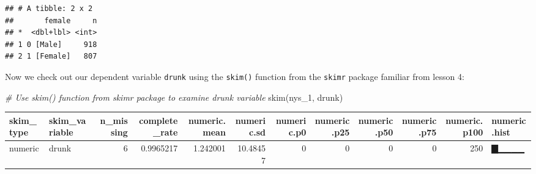 \documentclass[
]{book}
\newenvironment{Shaded}{\begin{snugshade}}{\end{snugshade}}
\newcommand{\AttributeTok}[1]{\textcolor[rgb]{0.77,0.63,0.00}{#1}}
\newcommand{\CommentTok}[1]{\textcolor[rgb]{0.56,0.35,0.01}{\textit{#1}}}
\newcommand{\DecValTok}[1]{\textcolor[rgb]{0.00,0.00,0.81}{#1}}
\newcommand{\FunctionTok}[1]{\textcolor[rgb]{0.00,0.00,0.00}{#1}}
\newcommand{\NormalTok}[1]{#1}
\newcommand{\OtherTok}[1]{\textcolor[rgb]{0.56,0.35,0.01}{#1}}
\newcommand{\SpecialCharTok}[1]{\textcolor[rgb]{0.00,0.00,0.00}{#1}}
\newcommand{\StringTok}[1]{\textcolor[rgb]{0.31,0.60,0.02}{#1}}
\begin{document}
\begin{Shaded}
\end{Shaded}

\begin{verbatim}
## # A tibble: 2 x 2
##       female     n
## *  <dbl+lbl> <int>
## 1 0 [Male]     918
## 2 1 [Female]   807
\end{verbatim}

Now we check out our dependent variable \texttt{drunk} using the \texttt{skim()} function from the \texttt{skimr} package familiar from lesson 4:

\begin{Shaded}
\begin{Highlighting}[]
\CommentTok{\# Use skim() function from skimr package to examine drunk variable }
\FunctionTok{skim}\NormalTok{(nys\_1, drunk)}
\end{Highlighting}
\end{Shaded}

\begin{tabular}{l|l|r|r|r|r|r|r|r|r|r|l}
\hline
skim\_type & skim\_variable & n\_missing & complete\_rate & numeric.mean & numeric.sd & numeric.p0 & numeric.p25 & numeric.p50 & numeric.p75 & numeric.p100 & numeric.hist\\
\hline
numeric & drunk & 6 & 0.9965217 & 1.242001 & 10.48457 & 0 & 0 & 0 & 0 & 250 & ▇▁▁▁▁\\
\hline
\end{tabular}
\end{document}

